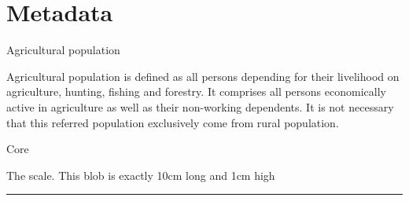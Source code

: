 \documentclass[print,Draft]{faosyb}
\begin{document}


\part{Metadata}
\EndPartIntro
{}

\begin{metadata}{Agricultural population}

Agricultural population is defined as all persons depending for their livelihood on agriculture, hunting, fishing and forestry. It comprises all persons economically active in agriculture as well as their non-working dependents. It is not necessary that this referred population exclusively come from rural population.
\end{metadata}

\begin{metadata}{Core}
  \lipsum[1]
\end{metadata}



\newpage

\onecolumn


\clearpage


The scale.  This blob is exactly 10cm long and 1cm high

\rule{10cm}{1cm}
\end{document}
